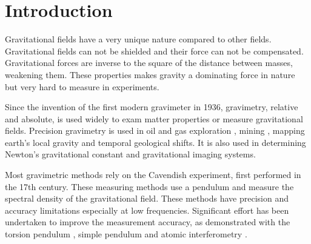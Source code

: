 \documentclass[\main/master.tex]{subfiles}
\begin{document}
\chapter{Introduction}\label{chapter:Introduction}


Gravitational fields have a very unique nature compared to other fields. Gravitational fields can not be shielded and their force can not be compensated. Gravitational forces are inverse to the square of the distance between masses, weakening them. These properties makes gravity a dominating force in nature but very hard to measure in experiments.
\par\noindent
Since the invention of the first modern gravimeter in 1936, gravimetry, relative and absolute, is used widely to exam matter properties or measure gravitational fields. Precision gravimetry \cite{Wahr04,Bingham10,Bell98,Leeuwen00,Diorio03,Romaides01,Peters01,Luther82,Kuroda95,Karagioz96,Bagley97,Gundlach00,Quinn01,Armstrong03,Kleinevoss99,Parks10,Peters99,Mcguirk02,Dimopoulos07,Lamporesi08,Sorrentino10,Rosi14,Goodkind99} is used in oil and gas exploration \cite{Bell98}, mining \cite{Leeuwen00}, mapping earth's local gravity \cite{Wahr04,Bingham10} and temporal geological shifts. It is also used in determining Newton's gravitational constant \cite{Luther82, Kuroda95, Karagioz96, Bagley97, Gundlach00, Quinn01, Armstrong03, Kleinevoss99, Parks10, Peters99, Mcguirk02, Dimopoulos07, Lamporesi08, Sorrentino10, Rosi14} and gravitational imaging systems. 
\par\noindent
Most gravimetric methods rely on the Cavendish experiment, first performed in the 17th century. These measuring methods use a pendulum and measure the spectral density of the gravitational field. These methods have precision and accuracy limitations especially at low frequencies. Significant effort has been undertaken to improve the measurement accuracy, as demonstrated with the torsion pendulum \cite{Luther82,Kuroda95,Karagioz96,Bagley97,Gundlach00,Quinn01,Armstrong03}, simple pendulum \cite {Kleinevoss99,Parks10} and atomic interferometry \cite{Lamporesi08,Sorrentino10,Rosi14}.
\iffalse
\end{document}
